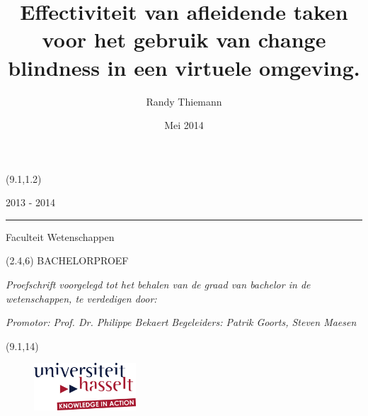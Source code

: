 \documentclass[a4paper,12pt]{report}
\title{Effectiviteit van afleidende taken voor het gebruik van change blindness in een virtuele omgeving.}  \let\Title\@title
\author{Randy Thiemann}                        \let\Author\@author
\date{Mei 2014}
\begin{document}

\thispagestyle{empty}

\begin{textblock}{7}(9.1,1.2)
    {\color{uhasselttext} 2013 - 2014 \rule{0.2mm}{2.1mm} }{\color{uhasseltblue} Faculteit Wetenschappen}
\end{textblock}

\begin{textblock}{6.5}(2.4,6)
    \vspace*{1.5cm}
    {\Large\noindent\color{uhasselttext} BACHELORPROEF}\newline
    
    \vspace{1.5cm}
    {\noindent\LARGE\bf\color{uhasseltblue} \Title}\newline
    
    \vspace{1.8cm}
    {\small\color{uhasselttext}\noindent\it Proefschrift voorgelegd tot het behalen van de graad van bachelor in de wetenschappen, te verdedigen door:}\newline
    
    {\noindent\color{uhasselttext}\bf \Author}\newline
    
    {\small\noindent\color{uhasselttext}\it Promotor: Prof. Dr. Philippe Bekaert}\newline
    {\small\noindent\color{uhasselttext}\it Begeleiders: Patrik Goorts, Steven Maesen}
    \vspace{1.5cm}
\end{textblock}

\begin{textblock}{6.5}(9.1,14)
    \begin{figure}[ht]
        \centering
        \includegraphics[width=1.5in]{images/logo_uhasselt}
    \end{figure}
\end{textblock}
\end{document}
